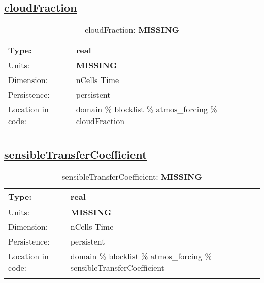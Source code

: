 \subsection[cloudFraction]{\hyperref[sec:var_tab_atmos_forcing]{cloudFraction}}
\label{subsec:var_sec_atmos_forcing_cloudFraction}
\begin{center}
\begin{longtable}{| p{2.0in} | p{4.0in} |}
        \hline 
        Type: & real \\
        \hline 
        Units: & {\bf \color{red} MISSING} \\
        \hline 
        Dimension: & nCells Time \\
        \hline 
        Persistence: & persistent \\
        \hline 
         Location in code: & domain \% blocklist \% atmos\_forcing \% cloudFraction \\
         \hline 
    \caption{cloudFraction: {\bf \color{red} MISSING}}
\end{longtable}
\end{center}
\subsection[sensibleTransferCoefficient]{\hyperref[sec:var_tab_atmos_forcing]{sensibleTransferCoefficient}}
\label{subsec:var_sec_atmos_forcing_sensibleTransferCoefficient}
\begin{center}
\begin{longtable}{| p{2.0in} | p{4.0in} |}
        \hline 
        Type: & real \\
        \hline 
        Units: & {\bf \color{red} MISSING} \\
        \hline 
        Dimension: & nCells Time \\
        \hline 
        Persistence: & persistent \\
        \hline 
         Location in code: & domain \% blocklist \% atmos\_forcing \% sensibleTransferCoefficient \\
         \hline 
    \caption{sensibleTransferCoefficient: {\bf \color{red} MISSING}}
\end{longtable}
\end{center}

